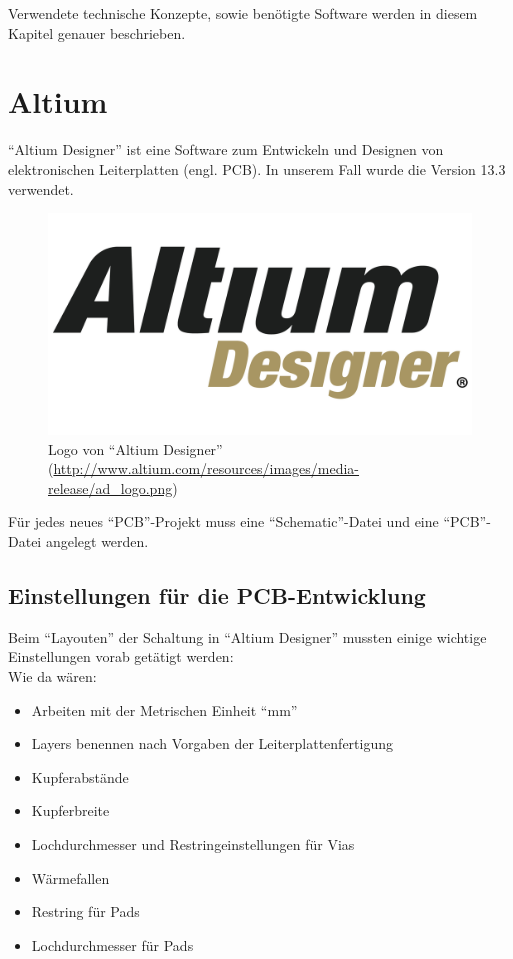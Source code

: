 Verwendete technische Konzepte, sowie benötigte Software werden in diesem Kapitel genauer beschrieben.

\section{Altium}\label{sec:3.1}
\enquote{Altium Designer} ist eine Software zum Entwickeln und Designen von elektronischen Leiterplatten (engl. PCB). In unserem Fall wurde die Version 13.3 verwendet. 
\begin{figure} [H]
	\centering
	\includegraphics[width=1\textwidth]{img/ad_logo.png}
	\caption{Logo von \enquote{Altium Designer} (\url{http://www.altium.com/resources/images/media-release/ad_logo.png})}
	\label{fig:3.1.1}
\end{figure}

Für jedes neues \enquote{PCB}-Projekt muss eine \enquote{Schematic}-Datei und eine \enquote{PCB}-Datei angelegt werden.



\subsection{Einstellungen für die PCB-Entwicklung}\label{subsec:3.1.1}
Beim \enquote{Layouten} der Schaltung in \enquote{Altium Designer} mussten einige wichtige Einstellungen vorab getätigt werden:\\
Wie da wären:
\begin{itemize}
	\item Arbeiten mit der Metrischen Einheit \enquote{mm}
	\item Layers benennen nach Vorgaben der Leiterplattenfertigung
	\item Kupferabstände
	\item Kupferbreite
	\item Lochdurchmesser und Restringeinstellungen für Vias
	\item Wärmefallen
	\item Restring für Pads
	\item Lochdurchmesser für Pads
\end{itemize}

